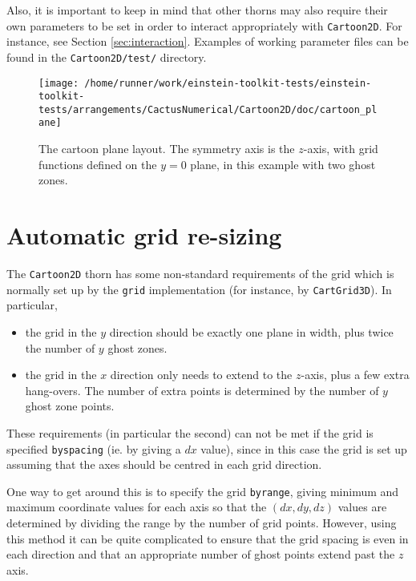 \documentclass{article}
\begin{document}
Also, it is important to keep in mind that other thorns may also
require their own parameters to be set in order to interact
appropriately with \texttt{Cartoon2D}. For instance, see Section
\ref{sec:interaction}. Examples of working parameter files can be
found in the \texttt{Cartoon2D/test/} directory.

\begin{figure}
  \centering
  \texttt{[image: /home/runner/work/einstein-toolkit-tests/einstein-toolkit-tests/arrangements/CactusNumerical/Cartoon2D/doc/cartoon\_plane]}
  \caption{The cartoon plane layout. The symmetry axis is the
    $z$-axis, with grid functions defined on the $y=0$ plane, in this
    example with two ghost zones.}
\end{figure}

\section{Automatic grid re-sizing}
\label{sec:regrid}

The \texttt{Cartoon2D} thorn has some non-standard requirements of the
grid which is normally set up by the \texttt{grid} implementation (for
instance, by \texttt{CartGrid3D}). In particular,

\begin{itemize}

  \item the grid in the $y$ direction should be exactly one plane in
    width, plus twice the number of $y$ ghost zones.

  \item the grid in the $x$ direction only needs to extend to the
    $z$-axis, plus a few extra hang-overs. The number of extra points
    is determined by the number of $y$ ghost zone points.

\end{itemize}

These requirements (in particular the second) can not be met if the
grid is specified \texttt{byspacing} (ie. by giving a $dx$ value),
since in this case the grid is set up assuming that the axes should be
centred in each grid direction.

One way to get around this is to specify the grid \texttt{byrange},
giving minimum and maximum coordinate values for each axis so that the
$(dx,dy,dz)$ values are determined by dividing the range by the number
of grid points. However, using this method it can be quite complicated
to ensure that the grid spacing is even in each direction and that an
appropriate number of ghost points extend past the $z$ axis.
\end{document}
